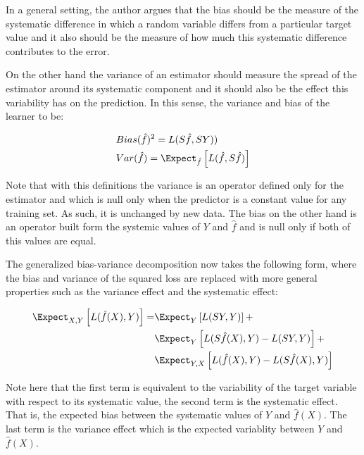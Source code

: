 In a general setting, the author argues that the bias should be the measure of the systematic difference in which a random variable differs from a particular target value and it also should be the measure of how much this systematic difference contributes to the error. 

On the other hand the variance of an estimator should measure the spread of the estimator around its systematic component and it should also be the effect this variability has on the prediction. In this sense, the variance and bias of the learner to be:

\begin{equation}
\begin{split}
& Bias(\hat{f})^2 = L(S\hat{f},SY)) \\
& Var(\hat{f}) = \Expect_{\hat{f}} \left[  L(\hat{f}  , S\hat{f}) \right]
\end{split}
\end{equation}

Note that with this definitions the variance is an operator defined only for the estimator and which is null only when the predictor is a constant value for any training set. As such, it is unchanged by new data. The bias on the other hand is an operator built form the systemic values of $Y$ and $\hat{f}$ and is null only if both of this values are equal.


The generalized bias-variance decomposition now takes the following form, where the bias and variance of the squared loss are replaced with more general properties such as the variance effect and the systematic effect:

\begin{equation}
\begin{split}
\Expect_{X,Y} \left[ L(\hat{f}(X),Y )\right] = &  \Expect_{Y} \left[ L(SY,Y )\right] + \\
			  &  \Expect_{Y} \left[ L(S\hat{f}(X),Y ) - L(SY,Y )\right] + \\
			  &  \Expect_{Y,X} \left[ L(\hat{f}(X),Y ) - L(S\hat{f}(X),Y )\right]
\end{split}
\end{equation}
 
Note here that the first term is equivalent to the variability of the target variable with respect to its systematic value, the second term is the systematic effect. That is, the expected bias between the systematic values of $Y$ and $\hat{f}(X)$. The last term is the variance effect which is the expected variablity between $Y$ and $\hat{f}(X)$. 
 
